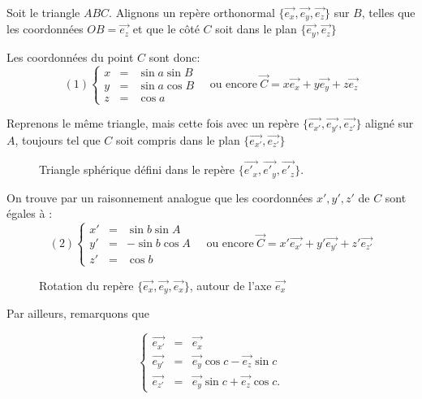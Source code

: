 \documentclass[12pt]{report}
\begin{document}
Soit le triangle $ABC$. Alignons un repère orthonormal $\{\vec{e_x},\vec{e_y},\vec{e_z}\}$ sur $B$, telles que les coordonnées  $OB=\vec{e_z}$ et que le côté $C$ soit dans le plan $\{\vec{e_y}, \vec{e_z}\}$

Les coordonnées du point $C$ sont donc:
\[
(1) \left\{ \begin{array}{lll} x &=& \sin a \sin B\\
y &=& \sin a \cos B \\
z &=& \cos a \end{array}\right. \quad \mbox{ou encore}\ \vec C = x \vec{e_x} + y \vec{e_y} + z \vec{e_z}
\]


Reprenons le même triangle, mais cette fois avec un repère $\{\vec{e_{x'}}, \vec{e_{y'}},\vec{e_{z'}}\}$ aligné sur $A$, toujours tel que $C$ soit compris dans le plan $\{\vec{e_{x'}},\vec{e_{z'}}\}$


\bigskip\bigskip

\begin{figure}[ht]
\begin{center}
\end{center}
\caption{Triangle sphérique défini dans le repère $\{\vec{e'_x},\vec{e'_y}, \vec{e'_z}\}$.}  
\label{fig:8}
\end{figure}


\bigskip\bigskip

On trouve par un raisonnement analogue que les coordonnées $x',y',z'$ de $C$ sont égales à :
\[
(2) \left\{ \begin{array}{lll} x' &=& \sin b \sin A\\
y' &=& -\sin b \cos A \\
z' &=& \cos b \end{array}\right. \quad \mbox{ou encore}\ \vec C = x' \vec{e_{x'}} + y' \vec{e_{y'}} + z' \vec{e_{z'}}
\]



\bigskip\bigskip

\begin{figure}[ht]
\begin{center}
\end{center}
\caption{Rotation du repère $\{\vec{e_x},\vec{e_y},\vec{e_x}\}$, autour de l'axe $\vec{e_x}$}
\label{fig:9}
\end{figure}
\bigskip\bigskip

Par ailleurs, remarquons que

\[
 \left\{ \begin{array}{lll} \vec{e_{x'}} &=& \vec{e_x}\\
\vec{e_{y'}} &=& \vec{e_y} \cos c - \vec{e_z} \sin c \\
\vec{e_{z'}}  &=&  \vec{e_y}  \sin c + \vec{e_z} \cos c.\end{array} \right. 
\]
\end{document}
